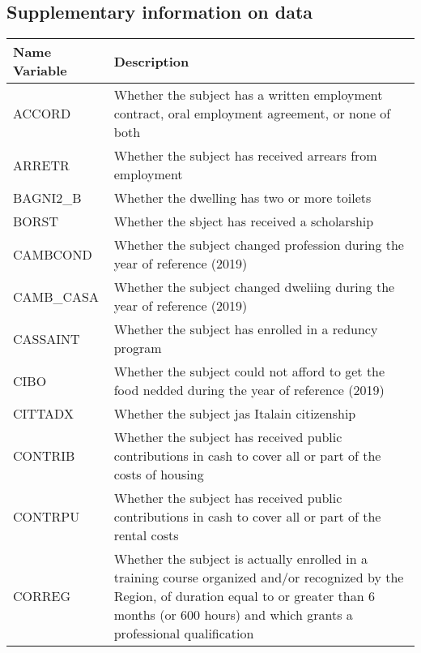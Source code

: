 \begin{appendices}
\noappendicestocpagenum
\addappheadtotoc

\section{Supplementary information on data}\label{apx: additional_info_data}

\begin{longtable}{ | m{4cm} | m{12cm}|}
    \hline
    \textbf{Name Variable} &  \textbf{Description}\\
    \hline
ACCORD &                Whether the subject has a written employment contract, oral employment agreement, or none of both\\ 
\hline
    ARRETR &                  Whether the subject has received arrears from employment\\
    \hline
    BAGNI2\_B &               Whether the dwelling has two or more toilets\\
    \hline
    BORST &                   Whether the sbject has received a scholarship\\
    \hline
    CAMBCOND &           Whether the subject changed profession during the year of reference (2019) \\
    \hline
    CAMB\_CASA &                 Whether the subject changed dweliing during the year of reference (2019) \\
    \hline
    CASSAINT &                 Whether the subject has enrolled in a reduncy program\\
    \hline
    CIBO &                  Whether the subject could not afford to get the food nedded during the year of reference (2019) \\
    \hline
    CITTADX &                 Whether the subject jas Italain citizenship \\
    \hline
    CONTRIB &                 Whether the subject has received public contributions in cash to cover all or part of the costs of housing \\
    \hline
    CONTRPU &                 Whether the subject has received public contributions in cash to cover all or part of the rental costs \\
    \hline
    CORREG &                 Whether the subject is actually enrolled in a training course organized and/or recognized by the Region, of duration equal to or greater than 6 months (or 600 hours) and which grants a professional qualification \\

\end{longtable}
\end{appendices}
